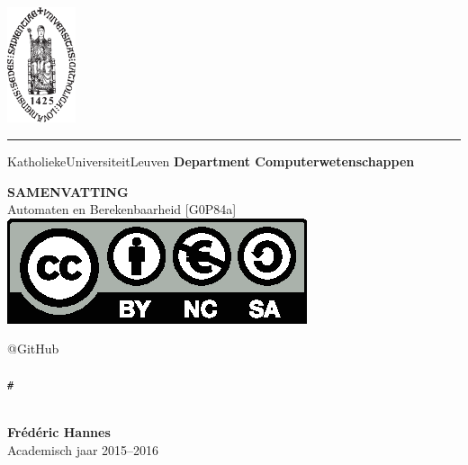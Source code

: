 \documentclass[a4paper]{article}
\begin{document}
\begin{titlepage}
    \newpage
    \thispagestyle{empty}
    \frenchspacing
    \hspace{-0.2cm}
    \includegraphics[height=3.4cm]{assets/sedes}
    \hspace{0.2cm}
    \rule{0.5pt}{3.4cm}
    \hspace{0.2cm}
    \begin{minipage}[b]{8cm}
        \large{Katholieke\newline Universiteit\newline Leuven}\smallskip\newline
        \large{}\smallskip\newline
        \textbf{Department \newline Computerwetenschappen}\smallskip
    \end{minipage}
    \vspace*{3.2cm}\vfill
    \begin{center}
        \begin{minipage}[t]{\textwidth}
            \begin{center}
                \large{\rm{\textbf{\uppercase{Samenvatting}}}}\\
                \large{\rm{Automaten en Berekenbaarheid [G0P84a]}}\\[2cm]
                \includegraphics[scale=1]{assets/by-nc-sa-eu.eps}
            \end{center}
        \end{minipage}
    \end{center}
    \vfill\vspace*{5cm}
    \begin{minipage}[t]{0.2\textwidth}
        \begin{center}
            @GitHub\\
            \\
            {\tt \#}
        \end{center}
    \end{minipage}\hfill
    \begin{minipage}[t]{0.35\textwidth}
        \vfill\noindent \\[5mm]
            {\rm \textbf{Fr\'ed\'eric Hannes}}\\[2mm]
            {\rm Academisch jaar 2015--2016}
    \end{minipage}
\end{titlepage}
\end{document}
